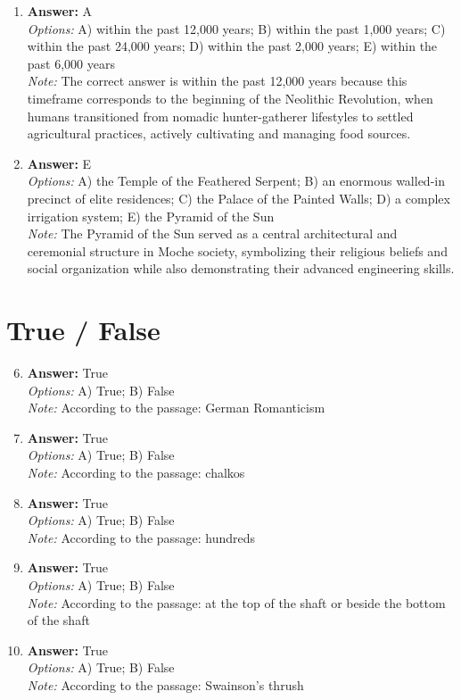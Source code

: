 \documentclass[12pt]{article}
\begin{document}
\begin{enumerate}[label=\arabic*.]
\item \textbf{Answer:} A
\\ \textit{Options:} A) within the past 12,000 years; B) within the past 1,000 years; C) within the past 24,000 years; D) within the past 2,000 years; E) within the past 6,000 years
\\ \textit{Note:} The correct answer is within the past 12,000 years because this timeframe corresponds to the beginning of the Neolithic Revolution, when humans transitioned from nomadic hunter-gatherer lifestyles to settled agricultural practices, actively cultivating and managing food sources.
\item \textbf{Answer:} E
\\ \textit{Options:} A) the Temple of the Feathered Serpent; B) an enormous walled-in precinct of elite residences; C) the Palace of the Painted Walls; D) a complex irrigation system; E) the Pyramid of the Sun
\\ \textit{Note:} The Pyramid of the Sun served as a central architectural and ceremonial structure in Moche society, symbolizing their religious beliefs and social organization while also demonstrating their advanced engineering skills.
\end{enumerate}

\section*{True / False}
\begin{enumerate}[label=\arabic*.]
\setcounter{enumi}{5}
\item \textbf{Answer:} True
\\ \textit{Options:} A) True; B) False
\\ \textit{Note:} According to the passage: German Romanticism
\item \textbf{Answer:} True
\\ \textit{Options:} A) True; B) False
\\ \textit{Note:} According to the passage: chalkos
\item \textbf{Answer:} True
\\ \textit{Options:} A) True; B) False
\\ \textit{Note:} According to the passage: hundreds
\item \textbf{Answer:} True
\\ \textit{Options:} A) True; B) False
\\ \textit{Note:} According to the passage: at the top of the shaft or beside the bottom of the shaft
\item \textbf{Answer:} True
\\ \textit{Options:} A) True; B) False
\\ \textit{Note:} According to the passage: Swainson's thrush
\end{enumerate}
\end{document}
